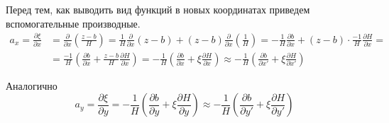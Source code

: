 Перед тем, как выводить вид функций в новых координатах
приведем вспомогательные производные.
\begin{equation*}
    \begin{split}
        a_{x}
        =
        \frac
            {\partial \xi}
            {\partial x}
        & =
        \frac
            {\partial}
            {\partial x}
        \left(
            \frac
                {z-b}
                {H}
        \right)
        =
        \frac
            {1}
            {H}
        \frac
            {\partial}
            {\partial x}
        \left(
            z - b
        \right)
        +
        \left(
            z - b
        \right)
        \frac
            {\partial}
            {\partial x}
        \left(
            \frac
                {1}
                {H}
        \right)
        =
        -
        \frac
            {1}
            {H}
        \frac
            {\partial b}
            {\partial x}
        +
        \left(
            z - b
        \right)
        \cdot
        \frac
            {-1}
            {H}
        \frac
            {\partial H}
            {\partial x}
        =
        \\ &
        =
        \frac
            {-1}
            {H}
        \left(
            \frac
                {\partial b}
                {\partial x}
            +
            \frac
                {z-b}
                {H}
            \frac
                {\partial H}
                {\partial x}
        \right)
        =
        -
        \frac
            {1}
            {H}
        \left(
            \frac
                {\partial b}
                {\partial x}
            +
            \xi
            \frac
                {\partial H}
                {\partial x}
        \right)
        \approx
        -
        \frac
            {1}
            {H}
        \left(
            \frac
                {\partial b}
                {\partial x'}
            +
            \xi
            \frac
                {\partial H}
                {\partial x'}
        \right)
    \end{split}
\end{equation*}

Аналогично
\begin{equation*}
    a_{y}
    =
    \frac
        {\partial \xi}
        {\partial y}
    =
    -
    \frac
        {1}
        {H}
    \left(
        \frac
            {\partial b}
            {\partial y}
        +
        \xi
        \frac
            {\partial H}
            {\partial y}
    \right)
    \approx
    -
    \frac
        {1}
        {H}
    \left(
        \frac
            {\partial b}
            {\partial y'}
        +
        \xi
        \frac
            {\partial H}
            {\partial y'}
    \right)
\end{equation*}

